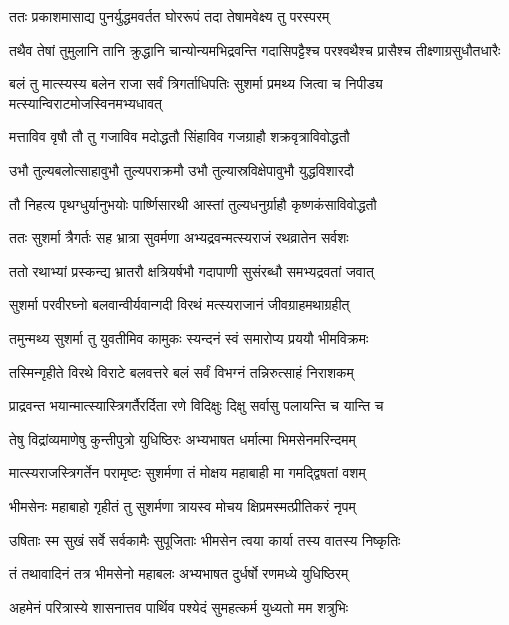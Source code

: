 \twolineshloka
{ततः प्रकाशमासाद्य पुनर्युद्धमवर्तत}
{घोररूपं तदा तेषामवेक्ष्य तु परस्परम्}


\twolineshloka
{तथैव तेषां तुमुलानि तानि क्रुद्धानि चान्योन्यमभिद्रवन्ति}
{गदासिपट्टैश्च परश्वथैश्च प्रासैश्च तीक्ष्णाग्रसुधौतधारैः}


\twolineshloka
{बलं तु मात्स्यस्य बलेन राजा सर्वं त्रिगर्ताधिपतिः सुशर्मा}
{प्रमथ्य जित्वा च निपीड्य मत्स्यान्विराटमोजस्विनमभ्यधावत्}


\twolineshloka
{मत्ताविव वृषौ तौ तु गजाविव मदोद्धतौ}
{सिंहाविव गजग्राहौ शक्रवृत्राविवोद्धतौ}


\twolineshloka
{उभौ तुल्यबलोत्साहावुभौ तुल्यपराक्रमौ}
{उभौ तुल्यास्रविक्षेपावुभौ युद्धविशारदौ}


\twolineshloka
{तौ निहत्य पृथग्धुर्यानुभयोः पार्ष्णिसारथी}
{आस्तां तुल्यधनुर्ग्राहौ कृष्णकंसाविवोद्धतौ}


\twolineshloka
{ततः सुशर्मा त्रैगर्तः सह भ्रात्रा सुवर्मणा}
{अभ्यद्रवन्मत्स्यराजं रथव्रातेन सर्वशः}


\twolineshloka
{ततो रथाभ्यां प्रस्कन्द्य भ्रातरौ क्षत्रियर्षभौ}
{गदापाणी सुसंरब्धौ समभ्यद्रवतां जवात्}


\twolineshloka
{सुशर्मा परवीरघ्नो बलवान्वीर्यवान्गदी}
{विरथं मत्स्यराजानं जीवग्राहमथाग्रहीत्}


\twolineshloka
{तमुन्मथ्य सुशर्मा तु युवतीमिव कामुकः}
{स्यन्दनं स्वं समारोप्य प्रययौ भीमविक्रमः}


\twolineshloka
{तस्मिन्गृहीते विरथे विराटे बलवत्तरे}
{बलं सर्वं विभग्नं तन्निरुत्साहं निराशकम्}


\twolineshloka
{प्राद्रवन्त भयान्मात्स्यास्त्रिगर्तैरर्दिता रणे}
{विदिक्षुः दिक्षु सर्वासु पलायन्ति च यान्ति च}


\twolineshloka
{तेषु विद्रांव्यमाणेषु कुन्तीपुत्रो युधिष्ठिरः}
{अभ्यभाषत धर्मात्मा भिमसेनमरिन्दमम्}


\twolineshloka
{मात्स्यराजस्त्रिगर्तेन परामृष्टः सुशर्मणा}
{तं मोक्षय महाबाही मा गमद्द्विषतां वशम्}


\twolineshloka
{भीमसेनः महाबाहो गृहीतं तु सुशर्मणा}
{त्रायस्व मोचय क्षिप्रमस्मत्प्रीतिकरं नृपम्}


\twolineshloka
{उषिताः स्म सुखं सर्वे सर्वकामैः सुपूजिताः}
{भीमसेन त्वया कार्या तस्य वातस्य निष्कृतिः}



\twolineshloka
{तं तथावादिनं तत्र भीमसेनो महाबलः}
{अभ्यभाषत दुर्धर्षो रणमध्ये युधिष्ठिरम्}


\twolineshloka
{अहमेनं परित्रास्ये शासनात्तव पार्थिव}
{पश्येदं सुमहत्कर्म युध्यतो मम शत्रुभिः}



